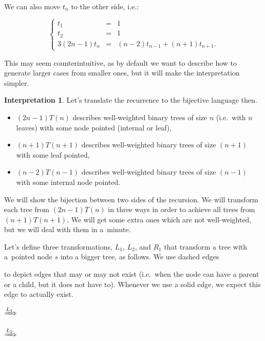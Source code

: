 \documentclass[final]{article}
\theoremstyle{definition}
\theoremstyle{definition}
\newtheorem{interpretation}{Interpretation}[subsection]
\theoremstyle{remark}
\newcommand{\includeinlinescaledsvg}[3]{\begin{minipage}{#1\textwidth}\begin{center}\end{center}\end{minipage}}
\begin{document}
We can also move \(t_n\) to the other side, i.e.:

\[\left\{\begin{array}{rcl}
            t_1 &=& 1\\
            t_2 &=& 1\\
            3 (2 n - 1) t_n &=& (n - 2) t_{n - 1} + (n + 1) t_{n + 1}.
\end{array}\right.\]

This may seem counterintuitive, as by default we want to describe how to generate larger cases from smaller ones, but it will make the interpretation simpler.

\begin{interpretation}
Let's translate the recurrence to the bijective language then.

\begin{itemize}
    \item \((2 n - 1) T(n)\) describes well-weighted binary trees of size \(n\) (i.e.~with \(n\) leaves) with some node pointed (internal or leaf),
    \item \((n + 1) T(n + 1)\) describes well-weighted binary trees of size \((n + 1)\) with some leaf pointed,
    \item \((n - 2) T(n - 1)\) describes well-weighted binary trees of size \((n - 1)\) with some internal node pointed.
\end{itemize}

We will show the bijection between two sides of the recursion. We will transform each tree from \((2 n - 1) T(n)\) in three ways in order to achieve all trees from \((n + 1) T(n + 1)\). We will get some extra ones which are not well-weighted, but we will deal with them in a~minute.

Let's define three transformations, \(L_1\), \(L_2\), and \(R_1\) that transform a tree with a~pointed node \(s\) into a bigger tree, as follows. We use dashed edges 
\begin{minipage}{1.5em}

\end{minipage}
to depict edges that may or may not exist (i.e.~when the node can have a parent or a child, but it does not have to). Whenever we use a solid edge, we expect this edge to actually exist.

\begin{center}
    \includeinlinescaledsvg{.16}{.5}{schroder__lr_base}%
    \(\xRightarrow{L_1}\)%
    \includeinlinescaledsvg{.16}{.5}{schroder__l1}%
    \hspace{.1\textwidth}%
    \includeinlinescaledsvg{.16}{.5}{schroder__lr_base}%
    \(\xRightarrow{L_2}\)%
    \includeinlinescaledsvg{.16}{.5}{schroder__l2}%


\end{center}
\end{interpretation}
\end{document}
